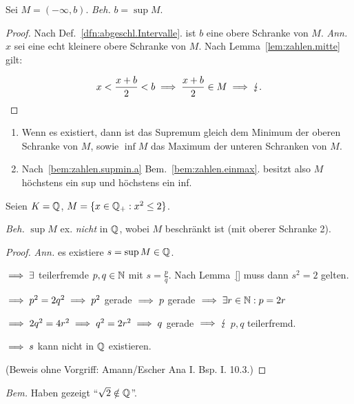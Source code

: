 \documentclass[12pt]{scrreprt}
\begin{document}
\begin{bsp} Sei $M=(-\infty,b)$. \emph{Beh.} $b=\sup M$.
\begin{proof} Nach Def.~\ref{dfn:abgeschl.Intervalle}. ist $b$ eine obere Schranke von $M$. \emph{Ann.} $x$ sei eine echt kleinere obere Schranke von $M$. Nach Lemma~\ref{lem:zahlen.mitte} gilt:

\[\displaystyle x < \frac{x+b}{2} < b\implies\frac{x+b}{2}\in M\implies\lightning.\]
\end{proof}
\end{bsp}

\begin{bem}\label{bem:zahlen.supmin}
\begin{enumerate}%
\item\label{bem:zahlen.supmin.a} Wenn es existiert, dann ist das Supremum gleich dem Minimum der oberen Schranke von $M$, sowie $\inf M$ das Maximum der unteren Schranken von $M$.

\item Nach~\ref{bem:zahlen.supmin.a} Bem.~\ref{bem:zahlen.einmax}. besitzt also $M$ höchstens ein sup und höchstens ein inf.
\end{enumerate}
\end{bem}

\begin{bsp}\label{bsp:zahlen.wurzelzwei}
Seien $K = \mathbb{Q}$, $M = \{x\in\mathbb{Q}_+: x^2 \leq 2\}$.

\emph{Beh.} $\sup M$ ex. \emph{nicht} in $\mathbb{Q}$, wobei $M$ beschränkt ist (mit oberer Schranke 2).
\begin{proof}\emph{Ann.} es existiere $s = \sup M\in\mathbb{Q}$.

$\implies \exists$ teilerfremde $p,q\in\mathbb{N}$ mit $\displaystyle s=\frac{p}{q}$. Nach Lemma~\ref{} muss dann $s^2 = 2$ gelten.

$\implies p^2 = 2q^2\implies p^2$ gerade $\implies p$ gerade $\implies\exists r\in\mathbb{N}: p = 2r$

$\implies 2q^2 = 4r^2\implies q^2=2r^2\implies q$ gerade $\implies\lightning$ $p,q$ teilerfremd.

$\implies s$ kann nicht in $\mathbb{Q}$ existieren.

(Beweis ohne Vorgriff: Amann/Escher Ana I. Bsp. I. 10.3.)
\end{proof}

\emph{Bem.} Haben gezeigt "`$\sqrt{2}\notin\mathbb{Q}$"'.
\end{bsp}
\end{document}
